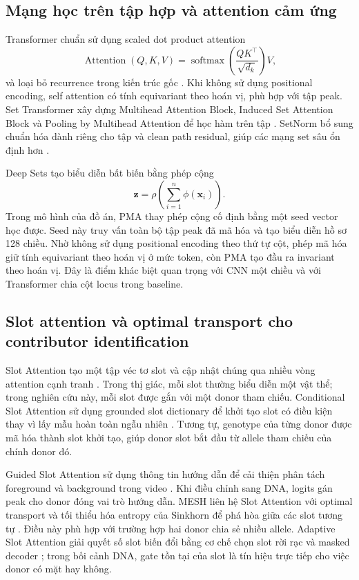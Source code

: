 \documentclass[12pt,a4paper]{article}
\begin{document}
\subsection{Mạng học trên tập hợp và attention cảm ứng}

Transformer chuẩn sử dụng scaled dot product attention
\begin{equation}
\operatorname{Attention}(Q,K,V)=
\operatorname{softmax}\left(\frac{QK^\top}{\sqrt{d_k}}\right)V,
\end{equation}
và loại bỏ recurrence trong kiến trúc gốc \cite{vaswani2017}. Khi không sử dụng positional encoding, self attention có tính equivariant theo hoán vị, phù hợp với tập peak. Set Transformer xây dựng Multihead Attention Block, Induced Set Attention Block và Pooling by Multihead Attention để học hàm trên tập \cite{lee2019}. SetNorm bổ sung chuẩn hóa dành riêng cho tập và clean path residual, giúp các mạng set sâu ổn định hơn \cite{zhang2023setnorm}.

Deep Sets tạo biểu diễn bất biến bằng phép cộng
\begin{equation}
\bm{z}=\rho\left(\sum_{i=1}^{n}\phi(\bm{x}_i)\right).
\end{equation}
Trong mô hình của đồ án, PMA thay phép cộng cố định bằng một seed vector học được. Seed này truy vấn toàn bộ tập peak đã mã hóa và tạo biểu diễn hồ sơ 128 chiều. Nhờ không sử dụng positional encoding theo thứ tự cột, phép mã hóa giữ tính equivariant theo hoán vị ở mức token, còn PMA tạo đầu ra invariant theo hoán vị. Đây là điểm khác biệt quan trọng với CNN một chiều và với Transformer chia cột locus trong baseline.

\subsection{Slot attention và optimal transport cho contributor identification}

Slot Attention tạo một tập véc tơ slot và cập nhật chúng qua nhiều vòng attention cạnh tranh \cite{locatello2020slot}. Trong thị giác, mỗi slot thường biểu diễn một vật thể; trong nghiên cứu này, mỗi slot được gắn với một donor tham chiếu. Conditional Slot Attention sử dụng grounded slot dictionary để khởi tạo slot có điều kiện thay vì lấy mẫu hoàn toàn ngẫu nhiên \cite{ma2024cosa}. Tương tự, genotype của từng donor được mã hóa thành slot khởi tạo, giúp donor slot bắt đầu từ allele tham chiếu của chính donor đó.

Guided Slot Attention sử dụng thông tin hướng dẫn để cải thiện phân tách foreground và background trong video \cite{lee2024gsa}. Khi điều chỉnh sang DNA, logits gán peak cho donor đóng vai trò hướng dẫn. MESH liên hệ Slot Attention với optimal transport và tối thiểu hóa entropy của Sinkhorn để phá hòa giữa các slot tương tự \cite{zhang2023mesh}. Điều này phù hợp với trường hợp hai donor chia sẻ nhiều allele. Adaptive Slot Attention giải quyết số slot biến đổi bằng cơ chế chọn slot rời rạc và masked decoder \cite{fan2024adaslot}; trong bối cảnh DNA, gate tồn tại của slot là tín hiệu trực tiếp cho việc donor có mặt hay không.
\end{document}

